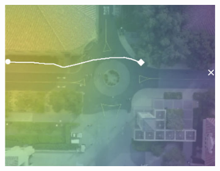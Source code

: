 \documentclass[usenames,dvipsnames]{article}
\begin{document}
\begin{enumerate}
\begin{item}
\begin{figure}[t!]
\begin{subfigure}[t]{0.5\textwidth}
\begin{minipage}[c]{0.3\linewidth}
		\includegraphics[width=\linewidth]{./figures/comparison/rand_death_1_2_t=370.jpg}
	\end{minipage}
	

\end{subfigure}
\end{figure}
\end{item}
\end{enumerate}
\end{document}
